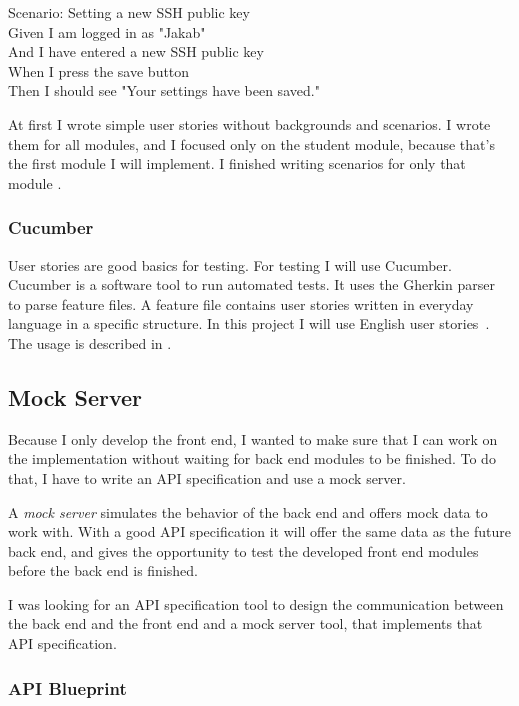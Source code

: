 Scenario: Setting a new SSH public key\\ \hspace*{1cm}
Given I am logged in as "Jakab"\\ \hspace*{1cm}
And I have entered a new SSH public key\\ \hspace*{1cm}
When I press the save button\\ \hspace*{1cm}
Then I should see "Your settings have been saved."

At first I wrote simple user stories without backgrounds and scenarios. I wrote them for all modules, and I focused only on the student module, because that's the first module I will implement. I finished writing scenarios for only that module .

\subsubsection{Cucumber}
User stories are good basics for testing. For testing I will use Cucumber. Cucumber is a software tool to run automated tests. It uses the Gherkin parser to parse feature files. A feature file contains user stories written in everyday language in a specific structure. In this project I will use English user stories~\cite{Cucumber-gherkin}. The usage is described in .


\subsection{Mock Server}

Because I only develop the front end, I wanted to make sure that I can work on the implementation without waiting for back end modules to be finished. To do that, I have to write an API specification and use a mock server. 

A \emph{mock server} simulates the behavior of the back end and offers mock data to work with. With a good API specification it will offer the same data as the future back end, and gives the opportunity to test the developed front end modules before the back end is finished.

I was looking for an API specification tool to design the communication between the back end and the front end and a mock server tool, that implements that API specification.

\subsubsection{API Blueprint}
\label{api-blueprint}

